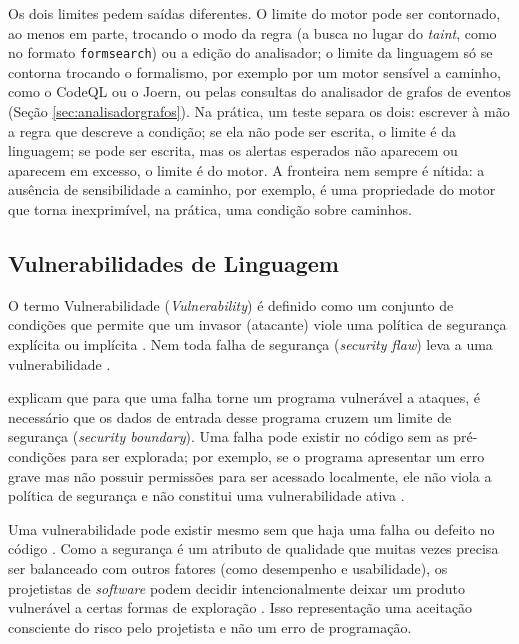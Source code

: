 \documentclass[
    12pt,                %
    openright,           %
    oneside,             %
    a4paper,             %
    english,             %
    brazil               %
]{abntex2}
\newcommand{\novo}[1]{{\color{red}#1}}
\begin{document}
\par
\novo{Os dois limites pedem saídas diferentes. O limite do motor pode ser contornado, ao menos em parte, trocando o modo da regra (a busca no lugar do \textit{taint}, como no formato \texttt{formsearch}) ou a edição do analisador; o limite da linguagem só se contorna trocando o formalismo, por exemplo por um motor sensível a caminho, como o CodeQL ou o Joern, ou pelas consultas do analisador de grafos de eventos (Seção \ref{sec:analisadorgrafos}). Na prática, um teste separa os dois: escrever à mão a regra que descreve a condição; se ela não pode ser escrita, o limite é da linguagem; se pode ser escrita, mas os alertas esperados não aparecem ou aparecem em excesso, o limite é do motor. A fronteira nem sempre é nítida: a ausência de sensibilidade a caminho, por exemplo, é uma propriedade do motor que torna inexprimível, na prática, uma condição sobre caminhos.}

\subsection{Vulnerabilidades de Linguagem}
\label{sec:vulnerabilidadeslinguagem}
\par
O termo Vulnerabilidade (\textit{Vulnerability}) é definido como um conjunto de condições que permite que um invasor (atacante) viole uma política de segurança explícita ou implícita \cite{seacord2013secure, seicertc2016}.
Nem toda falha de segurança (\textit{security flaw}) leva a uma vulnerabilidade \cite{seacord2013secure}.
\par
{} explicam que para que uma falha torne um programa vulnerável a ataques, é necessário que os dados de entrada desse programa cruzem um limite de segurança (\textit{security boundary}).
Uma falha pode existir no código sem as pré-condições para ser explorada; por exemplo, se o programa apresentar um erro grave mas não possuir permissões para ser acessado localmente, ele não viola a política de segurança e não constitui uma vulnerabilidade ativa \cite{seacord2013secure}.
\par
Uma vulnerabilidade pode existir mesmo sem que haja uma falha ou defeito no código \cite{seacord2013secure}.
Como a segurança é um atributo de qualidade que muitas vezes precisa ser balanceado com outros fatores (como desempenho e usabilidade), os projetistas de \textit{software} podem decidir intencionalmente deixar um produto vulnerável a certas formas de exploração \cite{seacord2013secure}.
Isso representação uma aceitação consciente do risco pelo projetista e não um erro de programação.
\end{document}
